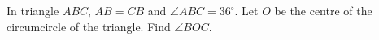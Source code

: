In triangle $ABC$, $AB=CB$ and $\angle ABC=36^\circ$. Let $O$ be the centre of the circumcircle of the triangle. Find $\angle BOC$.
